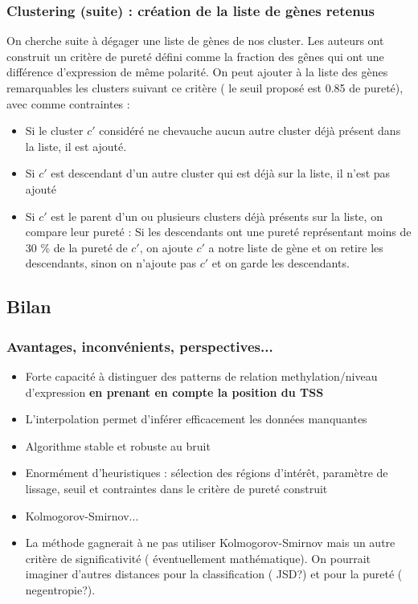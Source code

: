 \documentclass{beamer}
\begin{document}
\begin{frame}
\frametitle{Clustering (suite) : création de la liste de gènes retenus}
On cherche suite à dégager une liste de gènes de nos cluster. Les auteurs ont construit un critère de pureté défini comme la fraction des gênes qui ont une différence d'expression de même polarité. On peut ajouter à la liste des gènes remarquables les clusters suivant ce critère ( le seuil proposé est 0.85 de pureté), avec comme contraintes :
\begin{itemize}
\item<1-> Si le cluster $c'$ considéré ne chevauche aucun autre cluster déjà présent dans la liste, il est ajouté.
\item<2-> Si $c'$ est descendant d'un autre cluster qui est déjà sur la liste, il n'est pas ajouté
\item<3-> Si $c'$  est le parent d'un ou plusieurs clusters déjà présents sur la liste, on compare leur pureté : Si les descendants ont une pureté représentant moins de 30 \% de la pureté de $c'$, on ajoute $c'$ a notre liste de gène et on retire les descendants, sinon on n'ajoute pas $c'$ et on garde les descendants.
\end{itemize}
\end{frame}

\subsection{Bilan}
\begin{frame}
\frametitle{Avantages, inconvénients, perspectives...}
\begin{itemize}

\color{green}
\item Forte capacité à distinguer des patterns de relation methylation/niveau d'expression \textbf{en prenant en compte la position du TSS}
\item L'interpolation permet d'inférer efficacement les données manquantes
\item Algorithme stable et robuste au bruit

\color{red}
\item Enormément d'heuristiques : sélection des régions d'intérêt, paramètre de lissage, seuil et contraintes dans le critère de pureté construit
\item Kolmogorov-Smirnov...

\color{black}
\item La méthode gagnerait à ne pas utiliser Kolmogorov-Smirnov mais un autre critère de significativité ( éventuellement mathématique). On pourrait imaginer d'autres distances pour la classification ( JSD?) et pour la pureté ( negentropie?).
\end{itemize}
\end{frame}
\end{document}
